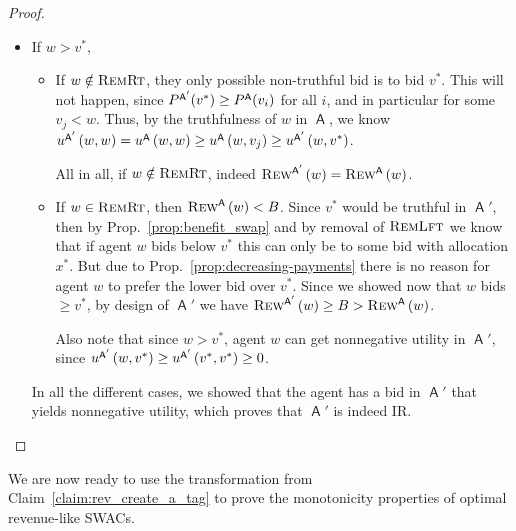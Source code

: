 \documentclass[11pt,letterpaper]{article}
\newcommand{\swacs}{SWACs\xspace}
\DeclareMathOperator{\A}{\auc{A}}
\newcommand{\vstar}{{v^*}}
\newcommand{\xstar}{{x^*}}
\DeclareMathOperator{\remrt}{\textsc{RemRt}}
\DeclareMathOperator{\remlft}{\textsc{RemLft}}
\theoremstyle{plain}
\newcommand{\auc}[1]{\mathsf{#1}}
\begin{document}
\begin{proof}
\begin{itemize}
\begin{itemize}
        \item  Else, $w\notin\remlft$ so it is possible for $w$ to bid truthfully in $\A'$, in which case $\trew[\A']{w}=\trew[\A]{w}$. If agent $w$ does not bid truthfully, it would only be to change their bid to $\vstar$, in which case $\trew[\A']{w}=B$.
    \end{itemize}
    \item If $w>\vstar$,
        \begin{itemize}
        \item If $w\notin\remrt$, they only possible non-truthful bid is to bid $\vstar$. This will not happen, since $\p[\A']{\vstar}\geq\p[\A]{v_i}$ for all $i$, and in particular for some $v_j<w$. Thus, by the truthfulness of $w$ in $\A$, we know $\util[\A']{w}{w}=\util[\A]{w}{w}\geq\util[\A]{w}{v_j}\geq\util[\A']{w}{\vstar}$.
        
        All in all, if $w\notin\remrt$, indeed $\trew[\A']{w}=\trew[\A]{w}$.
        \item If $w\in\remrt$, then $\trew[\A]{w}<B$. Since $\vstar$ would be truthful in $\A'$, then by Prop.~\ref{prop:benefit_swap} and by removal of $\remlft$ we know that if agent $w$ bids below $\vstar$ this can only be to some bid with allocation $\xstar$. But due to Prop.~\ref{prop:decreasing-payments} there is no reason for agent $w$ to prefer the lower bid over $\vstar$. Since we showed now that $w$ bids $\geq\vstar$, by design of $\A'$ we have $\trew[\A']{w}\geq B>\trew[\A]{w}$.
        
        Also note that since $w>\vstar$, agent $w$ can get nonnegative utility in $\A'$, since $\util[\A']{w}{\vstar}\geq\util[\A']{\vstar}{\vstar}\geq 0$.
    \end{itemize}

    In all the different cases, we showed that the agent has a bid in $\A'$ that yields nonnegative utility, which proves that $\A'$ is indeed IR.

\end{itemize}
\end{proof}

We are now ready to use the transformation from Claim~\ref{claim:rev_create_a_tag} to prove the monotonicity properties of optimal revenue-like \swacs.
\end{document}
